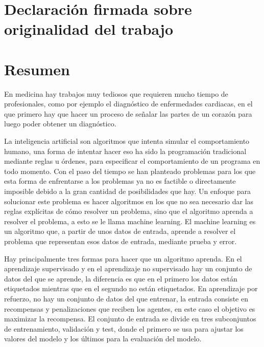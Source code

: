 \documentclass[12pt,a4paper]{article}
\begin{document}
\newpage
\listoftables

\newpage
{}
\section*{Declaración firmada sobre originalidad del trabajo}

\newpage
\section*{Resumen}
En medicina hay trabajos muy tediosos que requieren mucho tiempo de profesionales, como por ejemplo el diagnóstico de enfermedades cardiacas, en el que primero hay que hacer un proceso de señalar las partes de un corazón para luego poder obtener un diagnóstico.
\bigskip

La inteligencia artificial son algoritmos que intenta simular el comportamiento humano, una forma de intentar hacer eso ha sido la programación tradicional mediante reglas u órdenes, para especificar el comportamiento de un programa en todo momento. Con el paso del tiempo se han planteado problemas para los que esta forma de enfrentarse a los problemas ya no es factible o directamente imposible debido a la gran cantidad de posibilidades que hay. Un enfoque para solucionar este problema es hacer algoritmos en los que no sea necesario dar las reglas explícitas de cómo resolver un problema, sino que el algoritmo aprenda a resolver el problema, a esto se le llama machine learning. El machine learning es un algoritmo que, a partir de unos datos de entrada, aprende a resolver el problema que representan esos datos de entrada, mediante prueba y error.
\bigskip

Hay principalmente tres formas para hacer que un algoritmo aprenda. En el aprendizaje supervisado y en el aprendizaje no supervisado hay un conjunto de datos del que se aprende, la diferencia es que en el primero los datos están etiquetados mientras que en el segundo no están etiquetados. En aprendizaje por refuerzo, no hay un conjunto de datos del que entrenar, la entrada consiste en recompensas y penalizaciones que reciben los agentes, en este caso el objetivo es maximizar la recompensa. El conjunto de entrada se divide en tres subconjuntos de entrenamiento, validación y test, donde el primero se usa para ajustar los valores del modelo y los últimos para la evaluación del modelo.
\bigskip
\end{document}
